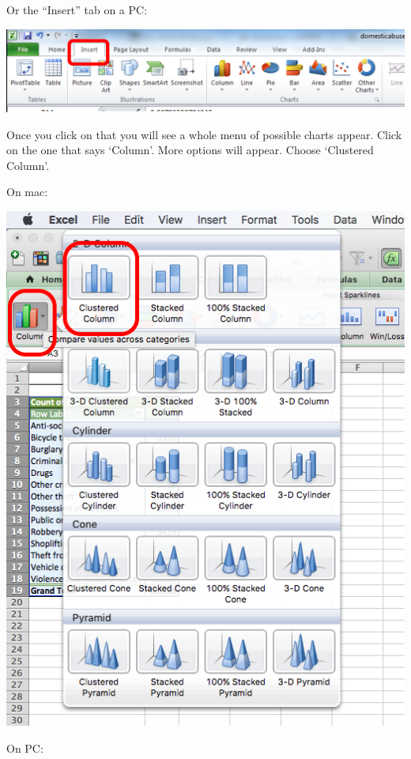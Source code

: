 \documentclass[
]{book}
\begin{document}
Or the ``Insert'' tab on a PC:

\includegraphics{imgs/on_pc_insert.png}

Once you click on that you will see a whole menu of possible charts appear. Click on the one that says `Column'. More options will appear. Choose `Clustered Column'.

On mac:

\includegraphics{imgs/click_column.png}

On PC:
\end{document}

